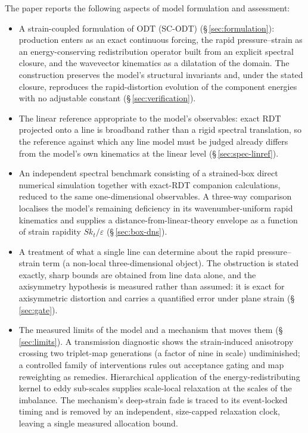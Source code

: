 \documentclass[lineno]{JFM-FLM_Au}
\begin{document}
The paper reports the following aspects of model formulation and assessment:
\begin{itemize}
\item A strain-coupled formulation of ODT (SC-ODT)
(\S\,\ref{sec:formulation}): production enters as an exact continuous
forcing, the rapid pressure--strain as an energy-conserving redistribution
operator built from an explicit spectral closure, and the wavevector
kinematics as a dilatation of the domain. The construction preserves the
model's structural invariants and, under the stated closure, reproduces
the rapid-distortion evolution of the component energies with no adjustable
constant (\S\,\ref{sec:verification}).

\item The linear reference appropriate to the model's observables: exact
RDT projected onto a line is broadband rather than a rigid spectral
translation, so the reference against which any line model must be judged
already differs from the model's own kinematics at the linear level
(\S\,\ref{sec:spec-linref}).

\item An independent spectral benchmark consisting of a strained-box direct
numerical simulation together with exact-RDT companion calculations,
reduced to the same one-dimensional observables. A three-way comparison
localises the model's remaining deficiency in its wavenumber-uniform rapid
kinematics and supplies a distance-from-linear-theory envelope as a
function of strain rapidity $Sk_t/\varepsilon$ (\S\,\ref{sec:box-dns}).

\item A treatment of what a single line can determine about the rapid
pressure--strain term (a non-local three-dimensional object). The
obstruction is stated exactly, sharp bounds are obtained from line data
alone, and the axisymmetry hypothesis is measured rather than assumed: it
is exact for axisymmetric distortion and carries a quantified error under
plane strain (\S\,\ref{sec:gate}).

\item The measured limits of the model and a mechanism that moves them
(\S\,\ref{sec:limits}). A transmission diagnostic shows the strain-induced
anisotropy crossing two triplet-map generations (a factor of nine in
scale) undiminished; a controlled family of interventions rules out
acceptance gating and map reweighting as remedies. Hierarchical application
of the energy-redistributing kernel to eddy sub-scales supplies scale-local
relaxation at the scales of the imbalance. The mechanism's deep-strain fade
is traced to its event-locked timing and is removed by an independent,
size-capped relaxation clock, leaving a single measured allocation bound.


\end{itemize}
\end{document}

